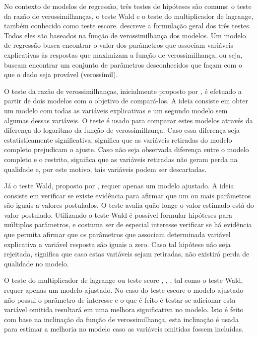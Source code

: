 No contexto de modelos de regressão, três testes de hipóteses são comuns: o teste da razão de verossimilhanças, o teste Wald e o teste do multiplicador de lagrange, também conhecido como teste escore. \citet{engle} descreve a formulação geral dos três testes. Todos eles são baseados na função de verossimilhança dos modelos. Um modelo de regressão busca encontrar o valor dos parâmetros que associam variáveis explicativas às respostas que maximizam a função de verossimilhança, ou seja, buscam encontrar um conjunto de parâmetros desconhecidos que façam com o que o dado seja provável (verossímil).

O teste da razão de verossimilhanças, inicialmente proposto por \citet{trv}, é efetuado a partir de dois modelos com o objetivo de compará-los. A ideia consiste em obter um modelo com todas as variáveis explicativas e um segundo modelo sem algumas dessas variáveis. O teste é usado para comparar estes modelos através da diferença do logaritmo da função de verossimilhança. Caso essa diferença seja estatísticamente significativa, significa que as variáveis retiradas do modelo completo prejudicam o ajuste. Caso não seja observada diferença entre o modelo completo e o restrito, significa que as variáveis retiradas não geram perda na qualidade e, por este motivo, tais variáveis podem ser descartadas.

Já o teste Wald, proposto por \citet{wald}, requer apenas um modelo ajustado. A ideia consiste em verificar se existe evidência para afirmar que um ou mais parâmetros são iguais a valores postulados. O teste avalia quão longe o valor estimado está do valor postulado. Utilizando o teste Wald é possível formular hipóteses para múltiplos parâmetros, e costuma ser de especial interesse verificar se há evidência que permita afirmar que os parâmetros que associam determinada variável explicativa a variável resposta são iguais a zero. Caso tal hipótese não seja rejeitada, significa que caso estas variáveis sejam retiradas, não existirá perda de qualidade no modelo.

O teste do multiplicador de lagrange ou teste score \citep{score1}, \citep{score2}, \citep{score3}, tal como o teste Wald, requer apenas um modelo ajustado. No caso do teste escore o modelo ajustado não possui o parâmetro de interesse e o que é feito é testar se adicionar esta variável omitida resultará em uma melhora significativa no modelo. Isto é feito com base na inclinação da função de verossimilhança, esta inclinação é usada para estimar a melhoria no modelo caso as variáveis omitidas fossem incluídas.

